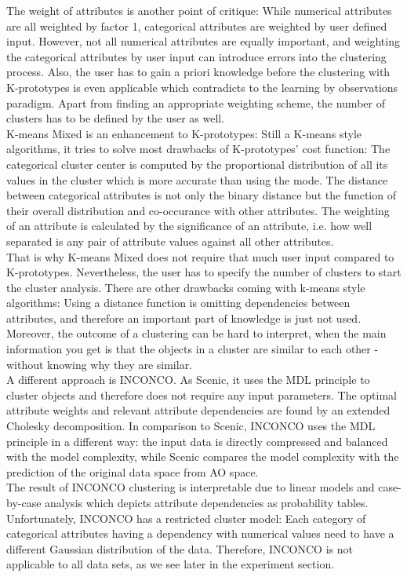\documentclass[conference]{IEEEtran}
\begin{document}
The weight of attributes is another point of critique: While numerical attributes are all weighted by factor 1, categorical attributes are weighted by user defined input. However, not all numerical attributes are equally important, and weighting the categorical attributes by user input can introduce errors into the clustering process. Also, the user has to gain a priori knowledge before the clustering with K-prototypes is even applicable which contradicts to the learning by observations paradigm. Apart from finding an appropriate weighting scheme, the number of clusters has to be defined by the user as well.
\\
K-means Mixed\cite{kmixed} is an enhancement to K-prototypes: Still a K-means style algorithms, it tries to solve most drawbacks of K-prototypes' cost function: The categorical cluster center is computed by the proportional distribution of all its values in the cluster which is more accurate than using the mode. The distance between categorical attributes is not only the binary distance but the function of their overall distribution and co-occurance with other attributes. The weighting of an attribute is calculated by the significance of an attribute, i.e. how well separated is any pair of attribute values against all other attributes.
\\
That is why K-means Mixed does not require that much user input compared to K-prototypes. Nevertheless, the user has to specify the number of clusters to start the cluster analysis. There are other drawbacks coming with k-means style algorithms: Using a distance function is omitting dependencies between attributes, and therefore an important part of knowledge is just not used. Moreover, the outcome of a clustering can be hard to interpret, when the main information you get is that the objects in a cluster are similar to each other - without knowing why they are similar.
\\
A different approach is INCONCO\cite{inconco}. As Scenic, it uses the MDL principle to cluster objects and therefore does not require any input parameters. The optimal attribute weights and relevant attribute dependencies are found by an extended Cholesky decomposition. In comparison to Scenic, INCONCO uses the MDL principle in a different way: the input data is directly compressed and balanced with the model complexity, while Scenic compares the model complexity with the prediction of the original data space from AO space. 
\\
The result of INCONCO clustering is interpretable due to linear models and case-by-case analysis which depicts attribute dependencies as probability tables. Unfortunately, INCONCO has a restricted cluster model: Each category of categorical attributes having a dependency with numerical values need to have a different Gaussian distribution of the data. Therefore, INCONCO is not applicable to all data sets, as we see later in the experiment section.
\end{document}

